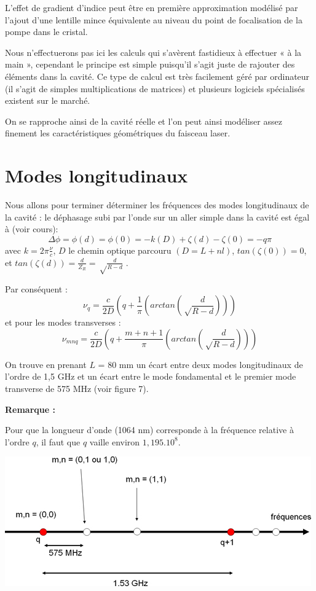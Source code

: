 \documentclass{book}
\begin{document}
L'effet de gradient d'indice peut être en première approximation modélisé par l'ajout d'une lentille mince équivalente au niveau du point de focalisation de la pompe dans le cristal.

Nous n'effectuerons pas ici les calculs qui s'avèrent fastidieux à effectuer « à la main », cependant le principe est simple puisqu'il s'agit juste de rajouter des éléments dans la cavité. Ce type de calcul est très facilement géré par ordinateur (il s'agit de simples multiplications de matrices) et plusieurs logiciels spécialisés existent sur le marché.

On se rapproche ainsi de la cavité réelle et l'on peut ainsi modéliser assez finement les caractéristiques géométriques du faisceau laser. 

\section{Modes longitudinaux}


Nous allons pour terminer déterminer les fréquences des modes longitudinaux de la cavité : le déphasage subi par l'onde sur un aller simple dans la cavité est égal à (voir cours):
\[\Delta \phi = \phi (d) = \phi (0) = -k(D) + \zeta (d) - \zeta (0) = -q\pi\]
avec \(k=2\pi \frac \nu c\), \(D\) le chemin optique parcouru \((D=L+nl)\), \(tan(\zeta(0))=0\), et \(tan(\zeta(d))=\frac d {Z_R} = \sqrt\frac d{R-d}\) .

Par conséquent :
\[\nu _q = \frac c {2D} \left( q+\frac 1 \pi \left( arctan\left(\sqrt\frac d {R-d}\right)\right)\right)\]
et pour les modes transverses :
\[\nu _{mnq} = \frac c {2D} \left( q+\frac {m+n+1} \pi \left( arctan\left(\sqrt\frac d {R-d}\right)\right)\right)\]

On trouve en prenant \(L\) = 80 mm un écart entre deux modes longitudinaux de l'ordre de 1,5 GHz et un écart entre le mode fondamental et le premier mode transverse de 575 MHz (voir figure 7).

\textbf{\color{remarque1}Remarque :}  
\begin{mdframed}[linecolor=remarque1, backgroundcolor=remarque2]

Pour que la longueur d'onde (1064 nm) corresponde à la fréquence relative à l'ordre \(q\), il faut que \(q\) vaille environ \(1,195.10^8\).

{\centering
\includegraphics[scale=1.7]{images/EC_Fig7.jpg}
\par}

\end{mdframed}
\end{document}

